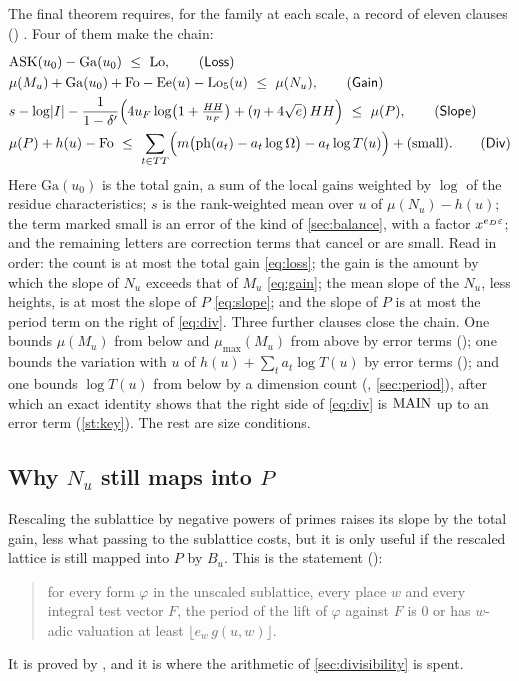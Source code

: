 The final theorem requires, for the family at each scale, a record of eleven clauses
(\textsubscript{}) \lvS. Four of them make the chain:
\begin{align}
&\ASK(u_0)-\mathrm{Ga}(u_0)\ \le\ \mathrm{Lo}, \tag{\textsf{Loss}}\label{eq:loss}\\
&\mu(M_u)+\mathrm{Ga}(u_0)+\mathrm{Fo}-\mathrm{Ee}(u)-\mathrm{Lo}_5(u)\ \le\ \mu(N_u),
   \tag{\textsf{Gain}}\label{eq:gain}\\
&s-\log\abs I-\frac{1}{1-\delta'}\Bigl(4u_F\log\bigl(1+\tfrac{HH}{u_F}\bigr)
     +(\eta+4\sqrt e)\,HH\Bigr)\ \le\ \mu(P), \tag{\textsf{Slope}}\label{eq:slope}\\
&\mu(P)+h(u)-\mathrm{Fo}\ \le\ \sum_{t\in TT}\Bigl(m\bigl(\ph(a_t)-a_t\log\Omega\bigr)-a_t\log T(u)\Bigr)
     +(\text{small}). \tag{\textsf{Div}}\label{eq:div}
\end{align}
Here $\mathrm{Ga}(u_0)$ is the total gain, a sum of the local gains weighted by $\log$ of the
residue characteristics; $s$ is the rank-weighted mean over $u$ of $\mu(N_u)-h(u)$; the term
marked small is an error of the kind of \cref{sec:balance}, with a factor $x^{e_D\varepsilon}$; and the
remaining letters are correction terms that cancel or are small. Read in order: the count is at
most the total gain \eqref{eq:loss}; the gain is the amount by which the slope of $N_u$ exceeds
that of $M_u$ \eqref{eq:gain}; the mean slope of the $N_u$, less heights, is at most the slope
of $P$ \eqref{eq:slope}; and the slope of $P$ is at most the period term on the right of
\eqref{eq:div}. Three further clauses close the chain. One bounds $\mu(M_u)$ from below and
$\mu_{\max}(M_u)$ from above by error terms (); one bounds the variation with $u$
of $h(u)+\sum_ta_t\log T(u)$ by error terms (); and one bounds $\log T(u)$ from
below by a dimension count (, \cref{sec:period}), after which an exact identity
shows that the right side of \eqref{eq:div} is $\mathrm{MAIN}$ up to an error term (\cref{st:key}).
The rest are size conditions.

\subsection{Why $N_u$ still maps into $P$}\label{sec:adm}
Rescaling the sublattice by negative powers of primes raises its slope by the total gain, less
what passing to the sublattice costs, but it is only useful if the rescaled lattice is still
mapped into $P$ by $B_u$. This is the statement
\lvS{} ():
\begin{quote}
for every form $\varphi$ in the unscaled sublattice, every place $w$ and every integral test
vector $F$, the period of the lift of $\varphi$ against $F$ is $0$ or has $w$-adic valuation at
least $\lfloor e_w\,g(u,w)\rfloor$.
\end{quote}
It is proved by , and it is where the arithmetic of
\cref{sec:divisibility} is spent.

